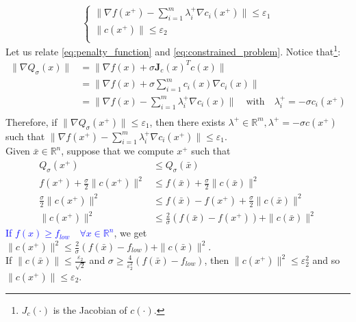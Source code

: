 \documentclass[12pt, openany]{report}
\newcommand{\R}{\mathbb{R}}
\theoremstyle{definition}
\begin{document}
\begin{equation}
	\begin{cases}
		\|\nabla f(x^+) - \displaystyle \sum_{i=1}^m \lambda_i^+ \nabla c_i(x^+) \| \leq \varepsilon_1\\
		\|c(x^+)\| \leq \varepsilon_2\\
	\end{cases}
\end{equation}
Let us relate \eqref{eq:penalty_function} and \eqref{eq:constrained_problem}. Notice that\footnote{$J_c(\cdot)$ is the Jacobian of $c(\cdot)$.}:
\begin{equation}
	\begin{aligned}
		\| \nabla Q_{\sigma} (x) \| &= \|\nabla f(x) + \sigma \mathbf{J}_c(x)^T c(x)\|\\
		&= \|\nabla f(x) + \sigma \sum_{i=1}^{m} c_i(x) \nabla c_i(x)\|\\
		&= \|\nabla f(x) - \sum_{i=1}^{m} \lambda_i^+ \nabla c_i(x)\| \quad \text{with}\quad \lambda_i^+ = - \sigma c_i(x^+)\\
	\end{aligned}
\end{equation}
Therefore, if $\| \nabla Q_{\sigma} (x^+) \| \leq \varepsilon_1$, then there exists $\lambda^+ \in \R^m, \lambda^+ = - \sigma c(x^+)$ such that $\|\nabla f(x^+) - \displaystyle \sum_{i=1}^{m} \lambda_i^+ \nabla c_i(x^+)\| \leq \varepsilon_1$.\\
Given $\bar{x} \in \R^n$, suppose that we compute $x^+$ such that
\begin{equation}
	\begin{aligned}
		Q_\sigma(x^+) &\leq Q_\sigma(\bar{x})\\
		f(x^+) + \frac{\sigma}{2} \|c(x^+)\|^2 &\leq f(\bar{x}) + \frac{\sigma}{2} \|c(\bar{x})\|^2\\
		\frac{\sigma}{2} \|c(x^+)\|^2 &\leq f(\bar{x}) - f(x^+) + \frac{\sigma}{2} \|c(\bar{x})\|^2\\
		\|c(x^+)\|^2 &\leq \frac{2}{\sigma} \left( f(\bar{x}) - f(x^+) \right) + \|c(\bar{x})\|^2
	\end{aligned}
\end{equation}
\textcolor{blue}{If $f(x) \geq f_{low} \quad \forall x \in \R^n$}, we get $\|c(x^+)\|^2 \leq \frac{2}{\sigma} (f(\bar{x}) - f_{low}) + \|c(\bar{x})\|^2$.\\
If $\|c(\bar{x})\| \leq \frac{\varepsilon_2}{\sqrt{2}}$ and $\sigma \geq \frac{4}{\varepsilon_2^2} (f(\bar{x})-f_{low})$, then $\|c(x^+)\|^2 \leq \varepsilon_2^2$ and so $\|c(x^+)\| \leq \varepsilon_2$.\\
\end{document}
